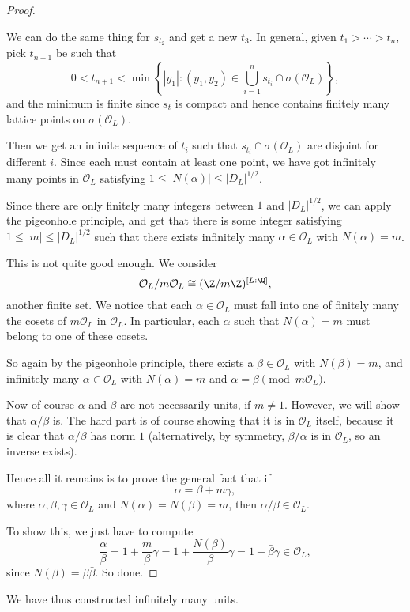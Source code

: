 \documentclass[a4paper]{article}
\begin{document}
\begin{proof}
\begin{center}
  \end{center}
  We can do the same thing for $s_{t_2}$ and get a new $t_3$. In general, given $t_1 > \cdots > t_n$, pick $t_{n + 1}$ be such that
  \[
    0 < t_{n + 1} < \min\left\{|y_1|: (y_1, y_2) \in \bigcup_{i = 1}^n s_{t_i} \cap \sigma(\mathcal{O}_L)\right\},
  \]
  and the minimum is finite since $s_t$ is compact and hence contains finitely many lattice points on $\sigma(\mathcal{O}_L)$.

  Then we get an infinite sequence of $t_i$ such that $s_{t_i} \cap \sigma(\mathcal{O}_L)$ are disjoint for different $i$. Since each must contain at least one point, we have got infinitely many points in $\mathcal{O}_L$ satisfying $1 \leq |N(\alpha)| \leq |D_L|^{1/2}$.

  Since there are only finitely many integers between $1$ and $|D_L|^{1/2}$, we can apply the pigeonhole principle, and get that there is some integer satisfying $1 \leq |m| \leq |D_L|^{1/2}$ such that there exists infinitely many $\alpha \in \mathcal{O}_L$ with $N(\alpha) = m$.

  This is not quite good enough. We consider
  \[
    \mathcal{O}_L/m\mathcal{O}_L \cong (\Z/m\Z)^{[L:\Q]},
  \]
  another finite set. We notice that each $\alpha \in \mathcal{O}_L$ must fall into one of finitely many the cosets of $m\mathcal{O}_L$ in $\mathcal{O}_L$. In particular, each $\alpha$ such that $N(\alpha) = m$ must belong to one of these cosets.

  So again by the pigeonhole principle, there exists a $\beta \in \mathcal{O}_L$ with $N(\beta) = m$, and infinitely many $\alpha \in \mathcal{O}_L$ with $N(\alpha) = m$ and $\alpha = \beta \pmod {m\mathcal{O}_L}$.

  Now of course $\alpha$ and $\beta$ are not necessarily units, if $m \not= 1$. However, we will show that $\alpha/\beta$ is. The hard part is of course showing that it is in $\mathcal{O}_L$ itself, because it is clear that $\alpha/\beta$ has norm $1$ (alternatively, by symmetry, $\beta/\alpha$ is in $\mathcal{O}_L$, so an inverse exists).

  Hence all it remains is to prove the general fact that if
  \[
    \alpha = \beta + m\gamma,
  \]
  where $\alpha, \beta, \gamma \in \mathcal{O}_L$ and $N(\alpha) = N(\beta) = m$, then $\alpha/\beta \in \mathcal{O}_L$.

  To show this, we just have to compute
  \[
    \frac{\alpha}{\beta} = 1 + \frac{m}{\beta}\gamma = 1 + \frac{N(\beta)}{\beta}\gamma = 1 + \bar{\beta} \gamma \in \mathcal{O}_L,
  \]
  since $N(\beta) = \beta\bar{\beta}$. So done.
\end{proof}
We have thus constructed infinitely many units.
\end{document}
